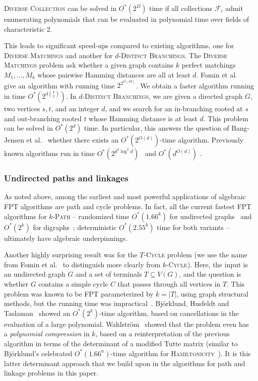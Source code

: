 \documentclass{theoretics}
\newcommand{\cF}{\ensuremath{\mathcal F}\xspace}
\begin{document}
\begin{theorem}
  \textsc{Diverse Collection} can be solved in $O^*(2^{D})$ time if all collections $\cF_i$ admit enumerating polynomials that can be evaluated in polynomial time over fields of characteristic 2.
\end{theorem}

This leads to significant speed-ups compared to existing algorithms, one for \textsc{Diverse Matchings} and another for \textsc{$d$-Distinct Branchings}.
The \textsc{Diverse Matchings} problem ask whether a given graph contains $k$ perfect matchings $M_1, \dots, M_k$ whose pairwise Hamming distances are all at least $d$.
Fomin et al.~\cite{FominGJPS24} give an algorithm with running time $2^{2^{O(kd)}}$.
We obtain a faster algorithm running in time $O^*(2^{d \binom{k}{2}})$.
In \textsc{$d$-Distinct Branchings}, we are given a directed graph $G$, two vertices $s, t$, and an integer $d$, and we search for an in-branching rooted at $s$ and out-branching rooted $t$ whose Hamming distance is at least $d$.
This problem can be solved in $O^*(2^d)$ time.
In particular, this answers the question of Bang-Jensen et al.~\cite{Bang-JensenK021} whether there exists an $O^*(2^{O(d)})$-time algorithm.
Previously known algorithms run in time $O^*(2^{d^2 \log^2 d})$~\cite{GutinRW18} and $O^*(d^{O(d)})$ \cite{Bang-JensenK021}.

\subsubsection{Undirected paths and linkages}
\label{ssec:linkage}
As noted above, among the earliest and most powerful
applications of algebraic FPT algorithms are path and cycle
problems. In fact, all the current fastest FPT algorithms for
\textsc{$k$-Path} -- randomized time $O^*(1.66^k)$ for undirected
graphs~\cite{BjorklundHKK17narrow} and $O^*(2^k)$ for
digraphs~\cite{Williams09IPL}; deterministic $O^*(2.55^k)$ time for
both variants \cite{Tsur19b} -- ultimately have algebraic underpinnings.

Another highly surprising result was for the \textsc{$T$-Cycle} problem
(we use the name from Fomin et al.~\cite{FominGKSS24} to
distinguish more clearly from \textsc{$k$-Cycle}).
Here, the input is an undirected graph $G$ and a set of terminals $T
\subseteq V(G)$, and the question is whether $G$ contains a simple
cycle $C$ that passes through all vertices in $T$. 
This problem was known to be FPT parameterized by $k=|T|$,
using graph structural methods, but the running time was 
impractical~\cite{Kawarabayashi08}. Bj\"orklund, Husfeldt and
Taslaman~\cite{BjorklundHT12soda} showed an $O^*(2^k)$-time algorithm,
based on cancellations in the evaluation of a large polynomial. 
Wahlstr\"om~\cite{Wahlstrom13STACS} showed that the problem even has a
\emph{polynomial compression} in $k$, based on a reinterpretation of
the previous algorithm in terms of the determinant of a modified Tutte
matrix (similar to Bj\"orklund's celebrated $O^*(1.66^n)$-time
algorithm for \textsc{Hamiltonicity}~\cite{Bjorklund14detsum}). 
It is this latter determinant approach that we build upon in the
algorithms for path and linkage problems in this paper. 
\end{document}
